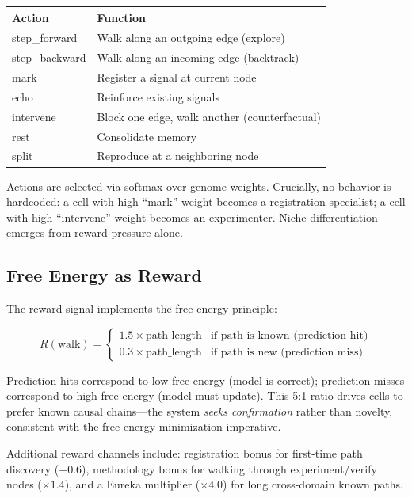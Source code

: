 \documentclass[aps,prl,reprint]{revtex4-2}
\begin{document}
\begin{center}
\begin{tabular}{ll}
\toprule
Action & Function \\
\midrule
step\_forward  & Walk along an outgoing edge (explore) \\
step\_backward & Walk along an incoming edge (backtrack) \\
mark           & Register a signal at current node \\
echo           & Reinforce existing signals \\
intervene      & Block one edge, walk another (counterfactual) \\
rest           & Consolidate memory \\
split          & Reproduce at a neighboring node \\
\bottomrule
\end{tabular}
\end{center}

Actions are selected via softmax over genome weights. Crucially, no behavior
is hardcoded: a cell with high ``mark'' weight becomes a registration
specialist; a cell with high ``intervene'' weight becomes an experimenter.
Niche differentiation emerges from reward pressure alone.

\subsection{Free Energy as Reward}

The reward signal implements the free energy principle:

\begin{equation}
R(\text{walk}) = \begin{cases}
1.5 \times \text{path\_length} & \text{if path is known (prediction hit)}\\
0.3 \times \text{path\_length} & \text{if path is new (prediction miss)}
\end{cases}
\end{equation}

Prediction hits correspond to low free energy (model is correct); prediction
misses correspond to high free energy (model must update). This 5:1 ratio
drives cells to prefer known causal chains---the system \emph{seeks
confirmation} rather than novelty, consistent with the free energy
minimization imperative.

Additional reward channels include: registration bonus for first-time path
discovery ($+0.6$), methodology bonus for walking through experiment/verify
nodes ($\times 1.4$), and a Eureka multiplier ($\times 4.0$) for long
cross-domain known paths.
\end{document}
